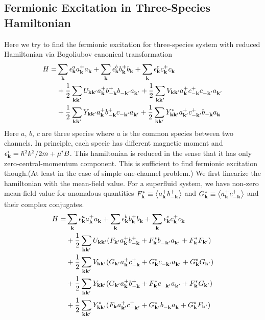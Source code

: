 \subsection{Fermionic Excitation in Three-Species Hamiltonian}
Here we try to find the fermionic excitation for three-species system with reduced Hamiltonian via Bogoliubov canonical transformation\cite{Tinkham}
\begin{equation}\label{eq:threeReducedHamiltonian}
\begin{split}
 H=&\sum_{\mathbf{k}}\epsilon^a_{\mathbf{k}}{}a^+_{\mathbf{k}}{}a^{}_{\mathbf{k}}+\sum_{\mathbf{k}}\epsilon^b_{\mathbf{k}}{}b^+_{\mathbf{k}}{}b^{}_{\mathbf{k}}+\sum_{\mathbf{k}}\epsilon^c_{\mathbf{k}}{}c^+_{\mathbf{k}}{}c^{}_{\mathbf{k}}\\
  &+\frac{1}{2}\sum_{\mathbf{k}\mathbf{k}'}U_{\mathbf{k}\mathbf{k}'}a^+_{\mathbf{k}}{}b^+_{-\mathbf{k}}{}b^{}_{-\mathbf{k}'}a^{}_{\mathbf{k}'}
	+\frac{1}{2}\sum_{\mathbf{k}\mathbf{k}'}V_{\mathbf{k}\mathbf{k}'}a^+_{\mathbf{k}}{}c^+_{-\mathbf{k}}{}c^{}_{-\mathbf{k}'}a^{}_{\mathbf{k}'}\\
 &+\frac{1}{2}\sum_{\mathbf{k}\mathbf{k}'}Y_{\mathbf{k}\mathbf{k}'}a^+_{\mathbf{k}}{}b^+_{-\mathbf{k}}{}c^{}_{-\mathbf{k}'}a^{}_{\mathbf{k}'}
	+\frac{1}{2}\sum_{\mathbf{k}\mathbf{k}'}Y^*_{\mathbf{k}\mathbf{k}'}a^+_{\mathbf{k}'}{}c^+_{-\mathbf{k}'}{}b^{}_{-\mathbf{k}}a^{}_{\mathbf{k}}
\end{split} 
\end{equation}
Here $a$, $b$, $c$ are three species where $a$ is the common species between two channels. In principle, each specie has different magnetic moment and $\epsilon^{i}_{\mathbf{k}}=\hbar^{2}k^{2}/2m+\mu^{i}B$. This hamiltonian is reduced in the sense that it has only zero-central-momentum component.  This is sufficient to find fermionic excitation though.(At least in the case of simple one-channel problem.)  We first linearize the hamiltonian with the mean-field value. For a superfluid system, we have non-zero mean-field value for anomalous quantities $F^{*}_{\mathbf{k}}\equiv\bigl<{a^+_{\mathbf{k}}{}b^+_{-\mathbf{k}}{}}\bigr>$ and $G^{*}_{\mathbf{k}}\equiv\bigl<{a^+_{\mathbf{k}}{}c^+_{-\mathbf{k}}{}}\bigr>$ and their complex conjugates. 
\begin{equation}
\begin{split}
 H=&\sum_{\mathbf{k}}\epsilon^a_{\mathbf{k}}{}a^+_{\mathbf{k}}{}a^{}_{\mathbf{k}}+\sum_{\mathbf{k}}\epsilon^b_{\mathbf{k}}{}b^+_{\mathbf{k}}{}b^{}_{\mathbf{k}}+\sum_{\mathbf{k}}\epsilon^c_{\mathbf{k}}{}c^+_{\mathbf{k}}{}c^{}_{\mathbf{k}}\\
  &+\frac{1}{2}\sum_{\mathbf{k}\mathbf{k}'}U_{\mathbf{k}\mathbf{k}'}(F_{\mathbf{k}'}a^+_{\mathbf{k}}{}b^+_{-\mathbf{k}}{}+F^{*}_{\mathbf{k}}{}b^{}_{-\mathbf{k}'}a^{}_{\mathbf{k}'}+F_{\mathbf{k}}^{*}F_{\mathbf{k}'})\\
	&+\frac{1}{2}\sum_{\mathbf{k}\mathbf{k}'}V_{\mathbf{k}\mathbf{k}'}(G_{\mathbf{k}'}a^+_{\mathbf{k}}{}c^+_{-\mathbf{k}}{}+G^{*}_{\mathbf{k}}c^{}_{-\mathbf{k}'}a^{}_{\mathbf{k}'}+G_{\mathbf{k}}^{*}G_{\mathbf{k}'})\\
 &+\frac{1}{2}\sum_{\mathbf{k}\mathbf{k}'}Y_{\mathbf{k}\mathbf{k}'}(G_{\mathbf{k}'}a^+_{\mathbf{k}}{}b^+_{-\mathbf{k}}{}+F^{*}_{\mathbf{k}}c^{}_{-\mathbf{k}'}a^{}_{\mathbf{k}'}+F_{\mathbf{k}}^{*}G_{\mathbf{k}'})\\
	&+\frac{1}{2}\sum_{\mathbf{k}\mathbf{k}'}Y^*_{\mathbf{k}\mathbf{k}'}(F_{\mathbf{k}}a^+_{\mathbf{k}'}{}c^+_{-\mathbf{k}'}{}+G^{*}_{\mathbf{k}'}b^{}_{-\mathbf{k}}a^{}_{\mathbf{k}}+G_{\mathbf{k}}^{*}F_{\mathbf{k}'})
\end{split} 
\end{equation}
